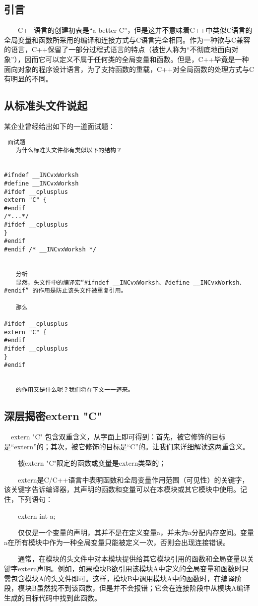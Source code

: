 \subsection{引言}
　　C++语言的创建初衷是“a better C”，但是这并不意味着C++中类似C语言的全局变量和函数所采用的编译和连接方式与C语言完全相同。作为一种欲与C兼容的语言，C++保留了一部分过程式语言的特点（被世人称为“不彻底地面向对象”），因而它可以定义不属于任何类的全局变量和函数。但是，C++毕竟是一种面向对象的程序设计语言，为了支持函数的重载，C++对全局函数的处理方式与C有明显的不同。

\subsection{从标准头文件说起}
某企业曾经给出如下的一道面试题：
\begin{verbatim}
 面试题
　　为什么标准头文件都有类似以下的结构？


#ifndef __INCvxWorksh
#define __INCvxWorksh 
#ifdef __cplusplus
extern "C" {
#endif 
/*...*/ 
#ifdef __cplusplus
}
#endif 
#endif /* __INCvxWorksh */


　　分析
　　显然，头文件中的编译宏“#ifndef __INCvxWorksh、#define __INCvxWorksh、#endif” 的作用是防止该头文件被重复引用。

　　那么

#ifdef __cplusplus
extern "C" {
#endif 
#ifdef __cplusplus
}
#endif


　　的作用又是什么呢？我们将在下文一一道来。
\end{verbatim} 
\subsection{深层揭密extern "C"}
　extern "C" 包含双重含义，从字面上即可得到：首先，被它修饰的目标是“extern”的；其次，被它修饰的目标是“C”的。让我们来详细解读这两重含义。

　　被extern "C"限定的函数或变量是extern类型的；

　　extern是C/C++语言中表明函数和全局变量作用范围（可见性）的关键字，该关键字告诉编译器，其声明的函数和变量可以在本模块或其它模块中使用。记住，下列语句：

　　extern int a;

　　仅仅是一个变量的声明，其并不是在定义变量a，并未为a分配内存空间。变量a在所有模块中作为一种全局变量只能被定义一次，否则会出现连接错误。

　　通常，在模块的头文件中对本模块提供给其它模块引用的函数和全局变量以关键字extern声明。例如，如果模块B欲引用该模块A中定义的全局变量和函数时只需包含模块A的头文件即可。这样，模块B中调用模块A中的函数时，在编译阶段，模块B虽然找不到该函数，但是并不会报错；它会在连接阶段中从模块A编译生成的目标代码中找到此函数。

